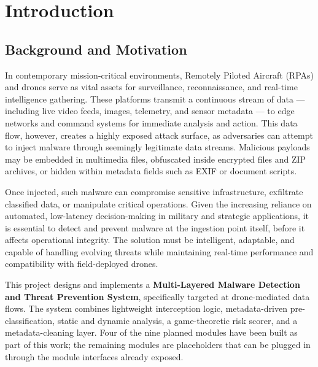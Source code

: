 \documentclass[12pt, a4paper]{report}
\begin{document}
\vfill

\cleardoublepage
{}
\setcounter{page}{1}


\chapter{Introduction}
\label{chap:intro}

\section{Background and Motivation}
In contemporary mission-critical environments, Remotely Piloted Aircraft
(RPAs) and drones serve as vital assets for surveillance, reconnaissance,
and real-time intelligence gathering. These platforms transmit a continuous
stream of data --- including live video feeds, images, telemetry, and sensor
metadata --- to edge networks and command systems for immediate analysis and
action. This data flow, however, creates a highly exposed attack surface, as
adversaries can attempt to inject malware through seemingly legitimate data
streams. Malicious payloads may be embedded in multimedia files, obfuscated
inside encrypted files and ZIP archives, or hidden within metadata fields
such as EXIF or document scripts.

Once injected, such malware can compromise sensitive infrastructure,
exfiltrate classified data, or manipulate critical operations. Given the
increasing reliance on automated, low-latency decision-making in military and
strategic applications, it is essential to detect and prevent malware at the
ingestion point itself, before it affects operational integrity. The solution
must be intelligent, adaptable, and capable of handling evolving threats
while maintaining real-time performance and compatibility with
field-deployed drones.

This project designs and implements a
\textbf{Multi-Layered Malware Detection and Threat Prevention System},
specifically targeted at drone-mediated data flows. The system combines
lightweight interception logic, metadata-driven pre-classification, static
and dynamic analysis, a game-theoretic risk scorer, and a metadata-cleaning
layer. Four of the nine planned modules have been built as part of this
work; the remaining modules are placeholders that can be plugged in through
the module interfaces already exposed.
\end{document}
